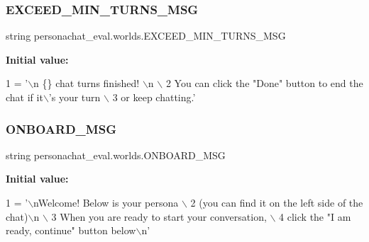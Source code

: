 \subsubsection{\texorpdfstring{E\+X\+C\+E\+E\+D\+\_\+\+M\+I\+N\+\_\+\+T\+U\+R\+N\+S\+\_\+\+M\+SG}{EXCEED\_MIN\_TURNS\_MSG}}
{\footnotesize\ttfamily string personachat\+\_\+eval.\+worlds.\+E\+X\+C\+E\+E\+D\+\_\+\+M\+I\+N\+\_\+\+T\+U\+R\+N\+S\+\_\+\+M\+SG}

{\bfseries Initial value\+:}
\begin{DoxyCode}
1 =  \textcolor{stringliteral}{'\(\backslash\)n \{\} chat turns finished! \(\backslash\)n \(\backslash\)}
2 \textcolor{stringliteral}{        You can click the "Done" button to end the chat if it\(\backslash\)'s your turn \(\backslash\)}
3 \textcolor{stringliteral}{        or keep chatting.'}
\end{DoxyCode}
\mbox{\label{namespacepersonachat__eval_1_1worlds_abc88de34626a01543ac942d5fce1efa5}} 
\subsubsection{\texorpdfstring{O\+N\+B\+O\+A\+R\+D\+\_\+\+M\+SG}{ONBOARD\_MSG}}
{\footnotesize\ttfamily string personachat\+\_\+eval.\+worlds.\+O\+N\+B\+O\+A\+R\+D\+\_\+\+M\+SG}

{\bfseries Initial value\+:}
\begin{DoxyCode}
1 =  \textcolor{stringliteral}{'\(\backslash\)nWelcome! Below is your persona \(\backslash\)}
2 \textcolor{stringliteral}{        (you can find it on the left side of the chat)\(\backslash\)n \(\backslash\)}
3 \textcolor{stringliteral}{        When you are ready to start your conversation, \(\backslash\)}
4 \textcolor{stringliteral}{        click the "I am ready, continue" button below\(\backslash\)n'}
\end{DoxyCode}
\mbox{\label{namespacepersonachat__eval_1_1worlds_aa17c7b4ff4b1d411001d4947c1caa475}} 

